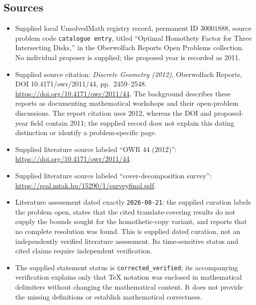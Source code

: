 \documentclass[11pt]{article}
\begin{document}
\subsection{Sources}
\begin{itemize}
\item Supplied local UnsolvedMath registry record, permanent ID \(30001888\), source problem code \texttt{catalogue entry}, titled ``Optimal Homothety Factor for Three Intersecting Disks,'' in the Oberwolfach Reports Open Problems collection. No individual proposer is supplied; the proposed year is recorded as 2011.
\item Supplied source citation: \emph{Discrete Geometry (2012)}, Oberwolfach Reports, DOI 10.4171/owr/2011/44, pp.\ 2459--2548. \url{https://doi.org/10.4171/owr/2011/44}. The background describes these reports as documenting mathematical workshops and their open-problem discussions. The report citation uses 2012, whereas the DOI and proposed-year field contain 2011; the supplied record does not explain this dating distinction or identify a problem-specific page.
\item Supplied literature source labeled ``OWR 44 (2012)'': \url{https://doi.org/10.4171/owr/2011/44}.
\item Supplied literature source labeled ``cover-decomposition survey'': \url{https://real.mtak.hu/15290/1/surveyfinal.pdf}.
\item Literature assessment dated exactly \texttt{2026-08-21}: the supplied curation labels the problem open, states that the cited translate-covering results do not supply the bounds sought for the homothetic-copy variant, and reports that no complete resolution was found. This is supplied dated curation, not an independently verified literature assessment. Its time-sensitive status and cited claims require independent verification.
\item The supplied statement status is \texttt{corrected\_verified}; its accompanying verification explains only that TeX notation was enclosed in mathematical delimiters without changing the mathematical content. It does not provide the missing definitions or establish mathematical correctness.
\end{itemize}
\end{document}
